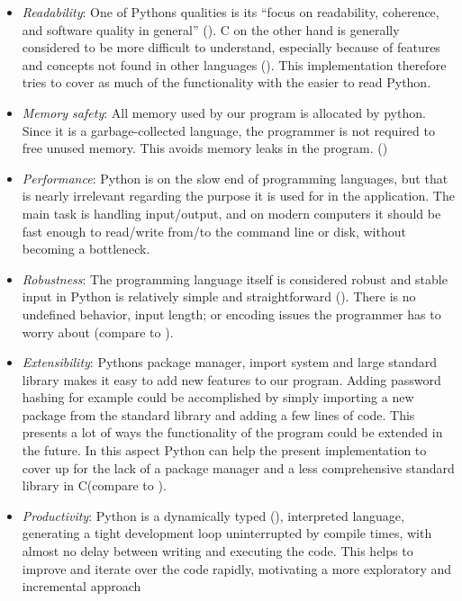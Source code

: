 \begin{itemize}

\item
  \emph{Readability}: One of Pythons qualities is its ``focus on
  readability, coherence, and software quality in general''
  (\cite[p. 3]{learningpython}). C on the other hand is generally considered to be
  more difficult to understand, especially because of features and
  concepts not found in other languages (\cite[p. 5]{cmodern}). This implementation
  therefore tries to cover as much of the functionality with the easier
  to read Python.
\item
  \emph{Memory safety}: All memory used by our program is allocated by
  python. Since it is a garbage-collected language, the programmer is not required to free unused memory. This avoids memory leaks in
  the program. (\cite[p. 18]{learningpython})
\item
  \emph{Performance}: Python is on the slow end of programming
  languages, but that is nearly irrelevant regarding the purpose it is used for in
  the application. The main task is handling input/output, and on modern
  computers it should be fast enough to read/write from/to the command
  line or disk, without becoming a bottleneck.
\item
  \emph{Robustness}: The programming language itself is considered
  robust and stable  input in Python is relatively
  simple and straightforward (\cite[p. 9]{learningpython}). There is no undefined behavior, input
  length; or encoding issues the programmer has to worry about (compare
  to \cite{scanf}).
\item
  \emph{Extensibility}: Pythons package manager, import system and large
  standard library makes it easy to add new features to our program.
  Adding password hashing for example could be accomplished by simply
  importing a new package from the standard library and adding a few
  lines of code. This presents a lot of ways the functionality of the program could be extended in the future.
   In this aspect Python can help the
  present implementation to cover up for the lack of a package manager
  and a less comprehensive standard library in C(compare
  \cite{clib} to \cite{pybib}).
\item
  \emph{Productivity}: Python is a dynamically typed (\cite[p. 9]{learningpython}), interpreted language, generating a tight development loop
  uninterrupted by compile times, with almost no delay between writing
  and executing the code. This helps to improve and iterate over the
  code rapidly, motivating a more exploratory and incremental approach

\end{itemize}
